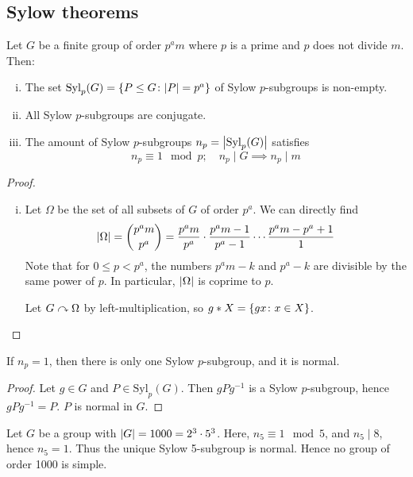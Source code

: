 \subsection{Sylow theorems}
\begin{theorem}
	Let \( G \) be a finite group of order \( p^a m \) where \( p \) is a prime and \( p \) does not divide \( m \).
	Then:
	\begin{enumerate}[(i)]
		\item The set \( \mathrm{Syl}_p(G) = \qty{P \leq G \colon \abs{P} = p^a} \) of Sylow \( p \)-subgroups is non-empty.
		\item All Sylow \( p \)-subgroups are conjugate.
		\item The amount of Sylow \( p \)-subgroups \( n_p = \abs{\mathrm{Syl}_p(G)} \) satisfies
			\[ n_p \equiv 1 \mod p;\quad n_p \mid G \implies n_p \mid m \]
	\end{enumerate}
\end{theorem}
\begin{proof}
	\begin{enumerate}[(i)]
		\item Let \( \Omega \) be the set of all subsets of \( G \) of order \( p^a \).
			We can directly find
			\[ \abs{\Omega} = \binom{p^a m}{p^a} = \frac{p^a m}{p^a} \cdot \frac{p^a m - 1}{p^a - 1} \cdots \frac{p^a m - p^a + 1}{1} \]
			Note that for \( 0 \leq p < p^a \), the numbers \( p^a m - k \) and \( p^a - k \) are divisible by the same power of \( p \).
			In particular, \( \abs{\Omega} \) is coprime to \( p \).
			
			Let \( G \curvearrowright \Omega \) by left-multiplication, so \( g \ast X = \qty{gx \colon x \in X} \).
	\end{enumerate}
\end{proof}
\begin{corollary}
	If \( n_p = 1 \), then there is only one Sylow \( p \)-subgroup, and it is normal.
\end{corollary}
\begin{proof}
	Let \( g \in G \) and \( P \in \mathrm{Syl}_p(G) \).
	Then \( g P g^{-1} \) is a Sylow \( p \)-subgroup, hence \( g P g^{-1} = P \).
	\( P \) is normal in \( G \).
\end{proof}
\begin{example}
	Let \( G \) be a group with \( \abs{G} = 1000 = 2^3 \cdot 5^3 \).
	Here, \( n_5 \equiv 1 \mod 5 \), and \( n_5 \mid 8 \), hence \( n_5 = 1 \).
	Thus the unique Sylow 5-subgroup is normal.
	Hence no group of order 1000 is simple.
\end{example}
